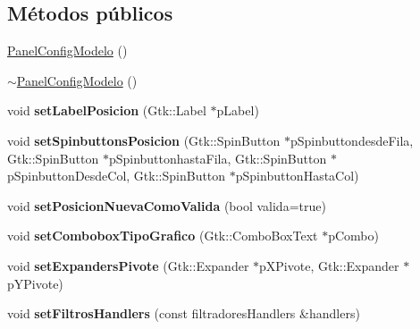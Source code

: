 \subsection*{\-Métodos públicos}
\begin{DoxyCompactItemize}
\item 
\hyperlink{classPanelConfigModelo_a9a807a8f717b7e592143293df72268d3}{\-Panel\-Config\-Modelo} ()
\item 
\hyperlink{classPanelConfigModelo_a9939a132ddf4630dac47597f42ab144f}{$\sim$\-Panel\-Config\-Modelo} ()
\item 
\hypertarget{classPanelConfigModelo_ab7cbf97595cd65d7ab222723afe616d6}{void {\bfseries set\-Label\-Posicion} (\-Gtk\-::\-Label $\ast$p\-Label)}\label{classPanelConfigModelo_ab7cbf97595cd65d7ab222723afe616d6}

\item 
\hypertarget{classPanelConfigModelo_a89cacb1393bc8a6c22a78b77385fed56}{void {\bfseries set\-Spinbuttons\-Posicion} (\-Gtk\-::\-Spin\-Button $\ast$p\-Spinbuttondesde\-Fila, \-Gtk\-::\-Spin\-Button $\ast$p\-Spinbuttonhasta\-Fila, \-Gtk\-::\-Spin\-Button $\ast$p\-Spinbutton\-Desde\-Col, \-Gtk\-::\-Spin\-Button $\ast$p\-Spinbutton\-Hasta\-Col)}\label{classPanelConfigModelo_a89cacb1393bc8a6c22a78b77385fed56}

\item 
\hypertarget{classPanelConfigModelo_a8b005131e24623de4219ed9c42958b31}{void {\bfseries set\-Posicion\-Nueva\-Como\-Valida} (bool valida=true)}\label{classPanelConfigModelo_a8b005131e24623de4219ed9c42958b31}

\item 
\hypertarget{classPanelConfigModelo_a0c84ddef18f7f04988882158554e0547}{void {\bfseries set\-Combobox\-Tipo\-Grafico} (\-Gtk\-::\-Combo\-Box\-Text $\ast$p\-Combo)}\label{classPanelConfigModelo_a0c84ddef18f7f04988882158554e0547}

\item 
\hypertarget{classPanelConfigModelo_afd23979a56f30e04f26dba6afc3914f6}{void {\bfseries set\-Expanders\-Pivote} (\-Gtk\-::\-Expander $\ast$p\-X\-Pivote, \-Gtk\-::\-Expander $\ast$p\-Y\-Pivote)}\label{classPanelConfigModelo_afd23979a56f30e04f26dba6afc3914f6}

\item 
\hypertarget{classPanelConfigModelo_afeab7c9180fde4e4735f25c248756fa4}{void {\bfseries set\-Filtros\-Handlers} (const filtradores\-Handlers \&handlers)}\label{classPanelConfigModelo_afeab7c9180fde4e4735f25c248756fa4}


\end{DoxyCompactItemize}
